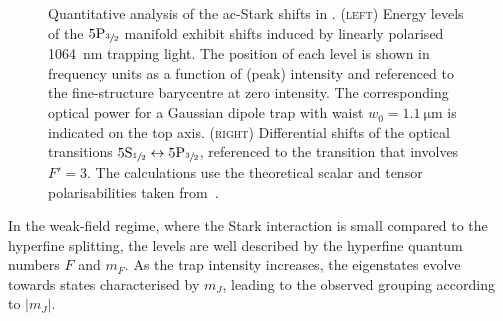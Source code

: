\documentclass[../Thesis-IJspeert.tex]{subfiles}
\begin{document}
\begin{figure}[t]
	\caption[Quantitative analysis of the ac-Stark shifts in ]{Quantitative analysis of the ac-Stark shifts in . \textsc{(left)} Energy levels of the $5\mathrm{P}_{\sfrac{3}{2}}$ manifold exhibit shifts induced by linearly polarised \SI{1064}{\nano\meter} trapping light. The position of each level is shown in frequency units as a function of (peak) intensity and referenced to the fine-structure barycentre at zero intensity. The corresponding optical power for a Gaussian dipole trap with waist $w_0 = \SI{1.1}{\micro\meter}$ is indicated on the top axis. \textsc{(right)} Differential shifts of the optical transitions $5\mathrm{S}_{\sfrac{1}{2}} \leftrightarrow 5\mathrm{P}_{\sfrac{3}{2}}$, referenced to the transition that involves $F' = 3$. The calculations use the theoretical scalar and tensor polarisabilities taken from~\cite{Arora2012}.}
	\label{starkfig}
\end{figure}
In the weak-field regime, where the Stark interaction is small compared to the hyperfine splitting, the levels are well described by the hyperfine quantum numbers $F$ and $m_F$. As the trap intensity increases, the eigenstates evolve towards states characterised by $m_J$, leading to the observed grouping according to $|m_J|$.
\end{document}
